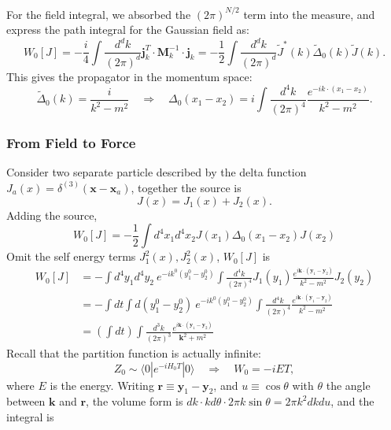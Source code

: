 For the field integral, we absorbed the $(2\pi)^{N/2}$ term into the measure, and express the path integral for the Gaussian field as:
\begin{equation}
	W_0[J] 
	= -\frac{i}{4}\int \frac{d^d k}{(2\pi)^d} \mathbf j^T_k \cdot \mathbf M^{-1}_k \cdot \mathbf j_k
	= -\frac{1}{2} \int \frac{d^d k}{(2\pi)^d}  \tilde{J}^*(k) \tilde{\Delta}_0(k) \tilde{J}(k).
\end{equation}
This gives the propagator in the momentum space:
\begin{equation}
	\tilde{\Delta}_0(k) = \frac{i}{k^2-m^2}
	\quad \Longrightarrow \quad 
	\Delta_0(x_1-x_2) = i\int\frac{d^{4} k}{(2\pi)^{4}} \frac{e^{-i k\cdot (x_1-x_2)}}{k^2-m^2}.
\end{equation}


\subsubsection{From Field to Force}
Consider two separate particle described by the delta function $J_a(x) = \delta^{(3)}(\bm x - \bm x_a)$, together the source is
\begin{equation}
	J(x) = J_1(x) + J_2(x).
\end{equation}
Adding the source,
\begin{equation*}
	W_0[J] = -\frac{1}{2}\int d^4x_1 d^4 x_2 J(x_1) \Delta_0(x_1-x_2) J(x_2)
\end{equation*}
Omit the self energy terms $J_1^2(x), J_2^2(x)$, $W_0[J]$ is
\begin{equation}
\begin{aligned}
	W_0[J] &= -\int d^4 y_1 d^4 y_2\ e^{-ik^0(y_1^0-y_2^0)}\int \frac{d^4 k}{(2\pi)^4} J_1(y_1)\frac{e^{i\bm k\cdot (\bm y_1-\bm y_2)}}{k^2-m^2} J_2(y_2) \\
	&= -\int  dt \int d (y_1^0 - y_2^0) \ e^{-ik^0(y_1^0-y_2^0)}\int \frac{d^4 k}{(2\pi)^4} \frac{e^{i\bm k\cdot (\bm y_1-\bm y_2)}}{k^2-m^2} \\
	&= \left(\int dt \right)\int \frac{d^3 k}{(2\pi)^3} \frac{e^{i\bm k\cdot (\bm y_1-\bm y_2)}}{\bm k^2 + m^2}
\end{aligned}
\end{equation}
Recall that the partition function is actually infinite:
\begin{equation}
	Z_0 \sim \langle 0| e^{-i H_0 T} |0\rangle \quad \Longrightarrow \quad
	W_0 = -i E T,
\end{equation}
where $E$ is the energy.
Writing $\bm r \equiv \bm y_1 - \bm y_2$, and $u \equiv \cos\theta$ with $\theta$ the angle between $\bm k$ and $\bm r$, the volume form is $dk \cdot kd\theta \cdot  2\pi k \sin \theta = 2\pi k^2 dk du$, and the integral is
